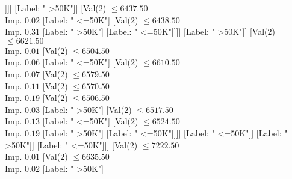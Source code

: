 \documentclass[margin=10pt]{standalone}
\begin{document}
\begin{forest}
																							[Val($2$) $ \leq 6421.50$ \\ Imp. $0.07$
																								[Val($2$) $ \leq 6409.50$ \\ Imp. $0.05$
																									[Val($2$) $ \leq 6283.50$ \\ Imp. $0.07$
																										[Label: " >50K"]
																										[Val($2$) $ \leq 6300.50$ \\ Imp. $0.19$
																											[Label: " <=50K"]
																											[Val($2$) $ \leq 6382.50$ \\ Imp. $0.32$
																												[Label: " >50K"]
																												[Label: " <=50K"]]]]
																									[Label: " >50K"]]
																								[Val($2$) $ \leq 6437.50$ \\ Imp. $0.02$
																									[Label: " <=50K"]
																									[Val($2$) $ \leq 6438.50$ \\ Imp. $0.31$
																										[Label: " >50K"]
																										[Label: " <=50K"]]]]
																							[Label: " >50K"]]
																						[Val($2$) $ \leq 6621.50$ \\ Imp. $0.01$
																							[Val($2$) $ \leq 6504.50$ \\ Imp. $0.06$
																								[Label: " <=50K"]
																								[Val($2$) $ \leq 6610.50$ \\ Imp. $0.07$
																									[Val($2$) $ \leq 6579.50$ \\ Imp. $0.11$
																										[Val($2$) $ \leq 6570.50$ \\ Imp. $0.19$
																											[Val($2$) $ \leq 6506.50$ \\ Imp. $0.03$
																												[Label: " >50K"]
																												[Val($2$) $ \leq 6517.50$ \\ Imp. $0.13$
																													[Label: " <=50K"]
																													[Val($2$) $ \leq 6524.50$ \\ Imp. $0.19$
																														[Label: " >50K"]
																														[Label: " <=50K"]]]]
																											[Label: " <=50K"]]
																										[Label: " >50K"]]
																									[Label: " <=50K"]]]
																							[Val($2$) $ \leq 7222.50$ \\ Imp. $0.01$
																								[Val($2$) $ \leq 6635.50$ \\ Imp. $0.02$
																									[Label: " >50K"]

\end{forest}
\end{document}

